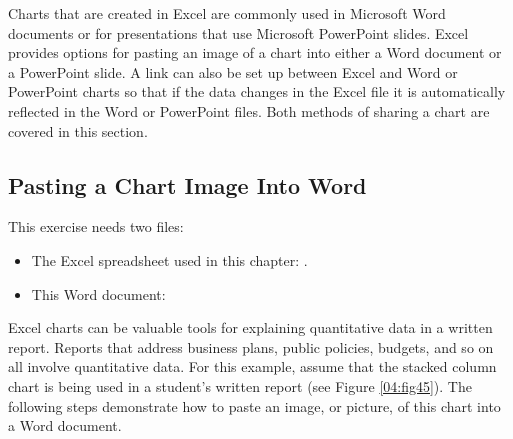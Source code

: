 Charts that are created in Excel are commonly used in Microsoft Word documents or for presentations that use Microsoft PowerPoint slides. Excel provides options for pasting an image of a chart into either a Word document or a PowerPoint slide. A link can also be set up between Excel and Word or PowerPoint charts so that if the data changes in the Excel file it is automatically reflected in the Word or PowerPoint files. Both methods of sharing a chart are covered in this section.

\subsection{Pasting a Chart Image Into Word}

This exercise needs two files:

\begin{itemize}
	\item The Excel spreadsheet used in this chapter: .
	\item This Word document: 
\end{itemize}

Excel charts can be valuable tools for explaining quantitative data in a written report. Reports that address business plans, public policies, budgets, and so on all involve quantitative data. For this example, assume that the  stacked column chart is being used in a student's written report (see Figure \ref{04:fig45}). The following steps demonstrate how to paste an image, or picture, of this chart into a Word document.

